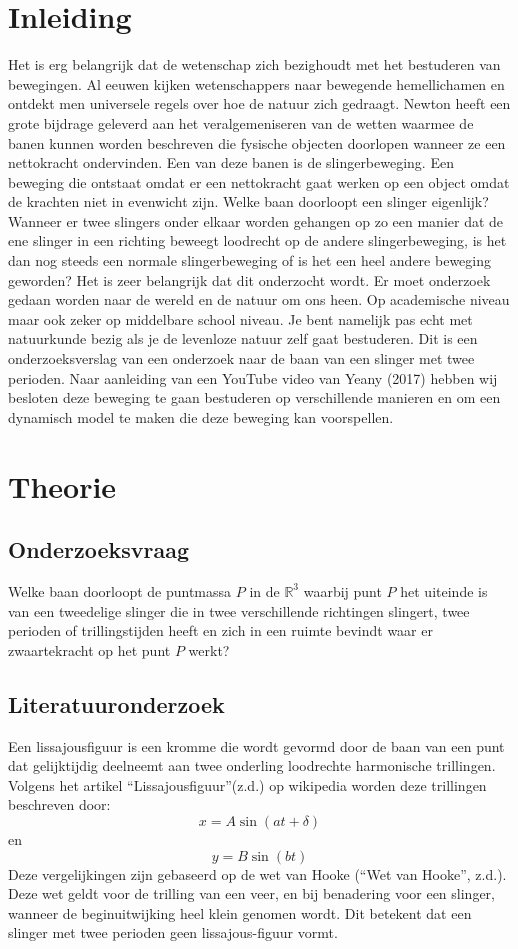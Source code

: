 \documentclass[a4paper]{article}
\begin{document}
	\section{Inleiding}
	Het is erg belangrijk dat de wetenschap zich bezighoudt met het bestuderen van bewegingen. Al eeuwen kijken wetenschappers naar bewegende hemellichamen en ontdekt men universele regels over hoe de natuur zich gedraagt. Newton heeft een grote bijdrage geleverd aan het veralgemeniseren van de wetten waarmee de banen  kunnen worden beschreven die fysische objecten doorlopen wanneer ze een nettokracht ondervinden. Een van deze banen is de slingerbeweging. Een beweging die ontstaat omdat er een nettokracht gaat werken op een object omdat de krachten niet in evenwicht zijn. Welke baan doorloopt een slinger eigenlijk? Wanneer er twee slingers onder elkaar worden gehangen op zo een manier dat de ene slinger in een richting beweegt loodrecht op de andere slingerbeweging, is het dan nog steeds een normale slingerbeweging of is het een heel andere beweging geworden? Het is zeer belangrijk dat dit onderzocht wordt. Er moet onderzoek gedaan worden naar de wereld en de natuur om ons heen. Op academische niveau maar ook zeker op middelbare school niveau. Je bent namelijk pas echt met natuurkunde bezig als je de levenloze natuur zelf gaat bestuderen.
	Dit is een onderzoeksverslag van een onderzoek naar de baan van een slinger met twee perioden. Naar aanleiding van een YouTube video van Yeany (2017) \cite{Bruce} hebben wij besloten deze beweging te gaan bestuderen op verschillende manieren en om een dynamisch model te maken die deze beweging kan voorspellen.

	
	\section{Theorie}
	
	
	\subsection{Onderzoeksvraag}
	Welke baan doorloopt de puntmassa $P$ in de $\mathbb{R}^3$ waarbij punt $P$ het uiteinde is van een tweedelige slinger die in twee verschillende richtingen slingert, twee perioden of trillingstijden heeft en zich in een ruimte bevindt waar er zwaartekracht op het punt $P$ werkt?
	
	
	\subsection{Literatuuronderzoek}
	Een lissajousfiguur is een kromme die wordt gevormd door de baan van een punt dat gelijktijdig deelneemt aan twee onderling loodrechte harmonische trillingen. Volgens het artikel ``Lissajousfiguur''(z.d.)\cite{Lissajous} op wikipedia worden deze trillingen beschreven door:
	\[
	x = A \sin{(at+\delta)}
	\]
	en
	\[
	y = B \sin{(bt)}
	\]
	Deze vergelijkingen zijn gebaseerd op de wet van Hooke (``Wet van Hooke'', z.d.)\cite{Hooke}. Deze wet geldt voor de trilling van een veer, en bij benadering voor een slinger, wanneer de beginuitwijking heel klein genomen wordt. Dit betekent dat een slinger met twee perioden geen lissajous-figuur vormt.
	
\end{document}
